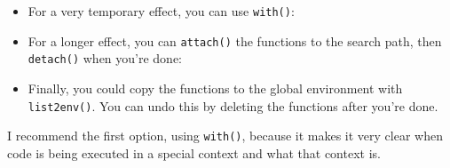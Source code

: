 \begin{itemize}
\item
  For a very temporary effect, you can use \texttt{with()}:

\begin{Shaded}
\begin{Highlighting}[]
\NormalTok{(}\NormalTok{, }\NormalTok{(}\NormalTok{), }\NormalTok{))}
\end{Highlighting}
\end{Shaded}
\item
  For a longer effect, you can \texttt{attach()} the functions to the
  search path, then \texttt{detach()} when you're done:

\begin{Shaded}
\begin{Highlighting}[]
\NormalTok{(}\NormalTok{, }\NormalTok{(}\NormalTok{), }\NormalTok{)}
\end{Highlighting}
\end{Shaded}
\item
  Finally, you could copy the functions to the global environment with
  \texttt{list2env()}. You can undo this by deleting the functions after
  you're done. 

\begin{Shaded}
\begin{Highlighting}[]
\NormalTok{())}
\NormalTok{(}\NormalTok{, }\NormalTok{(}\NormalTok{), }\NormalTok{)}
\NormalTok{(}  \NormalTok{())}
\end{Highlighting}
\end{Shaded}
\end{itemize}

I recommend the first option, using \texttt{with()}, because it makes it
very clear when code is being executed in a special context and what
that context is.

